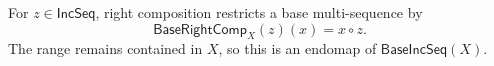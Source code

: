 \begin{definition}
For $z\in\mathsf{IncSeq}$, right composition restricts a base
multi-sequence by
\[
\mathsf{BaseRightComp}_X(z)(x)=x\circ z.
\]
The range remains contained in $X$, so this is an endomap of
$\mathsf{BaseIncSeq}(X)$.
\end{definition}
